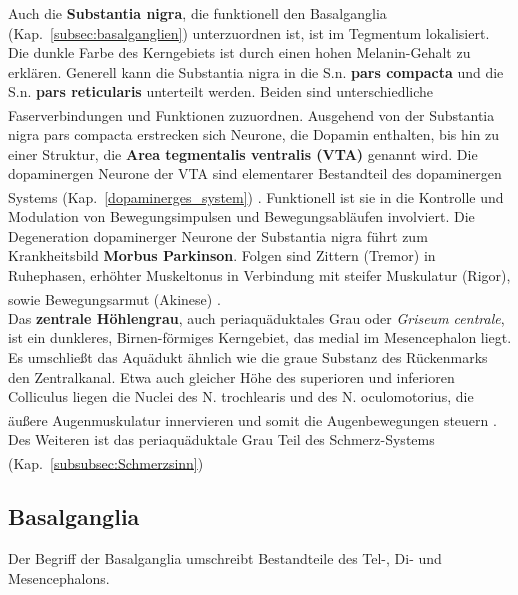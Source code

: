 \documentclass[12pt,a4paper,pdftex]{article}
\begin{document}
\noindent Auch die \textbf{Substantia nigra}, die funktionell den Basalganglia (Kap.~\ref{subsec:basalganglien}) unterzuordnen ist, ist im Tegmentum lokalisiert. Die dunkle Farbe des Kerngebiets ist durch einen hohen Melanin-Gehalt zu erklären. Generell kann die Substantia nigra in die S.n. \textbf{pars compacta} und die S.n. \textbf{pars reticularis} unterteilt werden. Beiden sind unterschiedliche Faserverbindungen und Funktionen zuzuordnen\textsuperscript{\cite[6]{trepel2011neuroanatomie}}. 
Ausgehend von der Substantia nigra pars compacta erstrecken sich Neurone, die Dopamin enthalten, bis hin zu einer Struktur, die \textbf{Area tegmentalis ventralis (VTA)} genannt wird. Die dopaminergen Neurone der VTA sind elementarer Bestandteil des dopaminergen Systems (Kap.~\ref{dopaminerges_system}) \textsuperscript{\cite[9]{crossman2014neuroanatomy}}. Funktionell ist sie in die Kontrolle und Modulation von Bewegungsimpulsen und Bewegungsabläufen involviert. Die Degeneration dopaminerger Neurone der Substantia nigra führt zum Krankheitsbild \textbf{Morbus Parkinson}. Folgen sind Zittern (Tremor) in Ruhephasen, erhöhter Muskeltonus in Verbindung mit steifer Muskulatur (Rigor), sowie Bewegungsarmut (Akinese) \textsuperscript{\cite[6]{trepel2011neuroanatomie}}. \\

\noindent Das \textbf{zentrale Höhlengrau}, auch periaquäduktales Grau oder \textit{Griseum centrale}, ist ein dunkleres, Birnen-förmiges  Kerngebiet, das medial im Mesencephalon liegt. Es umschließt das Aquädukt ähnlich wie die graue Substanz des Rückenmarks den Zentralkanal. Etwa auch gleicher Höhe des superioren und inferioren Colliculus liegen die Nuclei des N. trochlearis und des N. oculomotorius, die äußere Augenmuskulatur innervieren und somit die Augenbewegungen steuern \textsuperscript{\cite[9]{crossman2014neuroanatomy}}. Des Weiteren ist das periaquäduktale Grau Teil des Schmerz-Systems (Kap.~\ref{subsubsec:Schmerzsinn}) \textsuperscript{\cite[25]{paxinos2014rat}}


\subsection{Basalganglia}
\label{subsec:Basalganglia} 

Der Begriff der Basalganglia umschreibt Bestandteile des Tel-, Di- und Mesencephalons.
\end{document}
